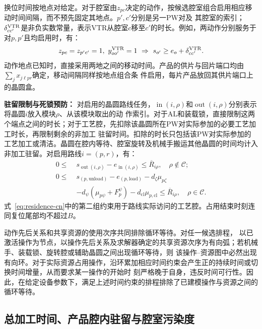 \documentclass[preprint,12pt,nonatbib]{elsarticle}
\begin{document}
换位时间按地点对给定。对于腔室由$z_{pc}$决定的动作，按候选腔室组合启用相应移动时间间隔，而不预先固定其地点。$p',c'$分别是另一PW对及
其腔室的索引；$\delta^{\rm VTR}_{cc'}$是非负实数常量，表示VTR从腔室$c$移至$c'$的时长。例如，两动作分别服务于对$p,p'$且均启用时，有：
\begin{equation}
\begin{aligned}
z_{pc}=z_{p'c'}=1,\ y^{\rm VTR}_{oo'}=1
\ \Rightarrow\ s_{o'}\ge e_o+\delta^{\rm VTR}_{cc'}.
\end{aligned}
\label{eq:location-travel-cn}
\end{equation}
动作地点已知时，直接采用两地之间的移动时间。产品的供片与回片端口均由$\sum_jx_{j\ell pr}$确定，移动间隔同样按地点组合条
件启用，每片产品放回其供片端口上的晶圆盒。

\noindent\textbf{驻留限制与死锁预防：}
对启用的晶圆路线任务，$\operatorname{in}(i,\rho)$和$\operatorname{out}(i,\rho)$分别表示将晶圆$i$放入模块$\rho$、从该模块取出的动
作索引。对于AL和装载锁，直接限制这两个端点之间的时长；对于工艺腔，先扣除该晶圆所在PW对实际参加的必要工艺加工时长，再限制剩余的非加工
驻留时间。扣除的时长只包括该PW对实际参加的工艺加工或清洁。晶圆在腔内等待、腔室旋转及机械手搬运其他晶圆的时间均计入非加工驻留。对启用路线$i=(p,r)$，有：
\begin{equation}
\begin{aligned}
0\le\;&s_{\operatorname{out}(i,\rho)}-e_{\operatorname{in}(i,\rho)}
\le\overline R_{i\rho},\quad \rho\notin\mathcal C;\\
0\le\;&s_{(p,\mathrm{unload})}-e_{(p,\mathrm{load})}
-d_\zeta\mu_{p\zeta}\\
&-d_\psi(\mu_{p\psi}+F_p^\psi)
-d_{\mathrm{cl}}\mu_{p,\mathrm{cl}}\le\overline R_{i\rho},
\quad\rho\in\mathcal C.
\end{aligned}
\label{eq:residence-cn}
\end{equation}
式~\eqref{eq:residence-cn}中的第二组约束用于路线实际访问的工艺腔。占用结束时刻连同复位尾部均不超过$B$。

动作先后关系和共享资源的使用次序共同排除循环等待。对任一候选排程，
以已激活操作为节点，以操作先后关系及求解器确定的共享资源次序为有向弧；若机械手、装载锁、旋转腔或辅助晶圆之间出现循环等待，则
该操作--资源图中必然出现有向环。对于实际资源占用操作，沿环累加相应时间约束会产生正的持续时间或切换时间增量，从而要求某一操作的开始时
刻严格晚于自身，违反时间可行性。因此，在给定设备参数下，满足上述时间约束的排程排除了已建模操作与资源之间的循环等待。

\subsection{总加工时间、产品腔内驻留与腔室污染度}
\label{sec:model-objective-cn}
\end{document}
